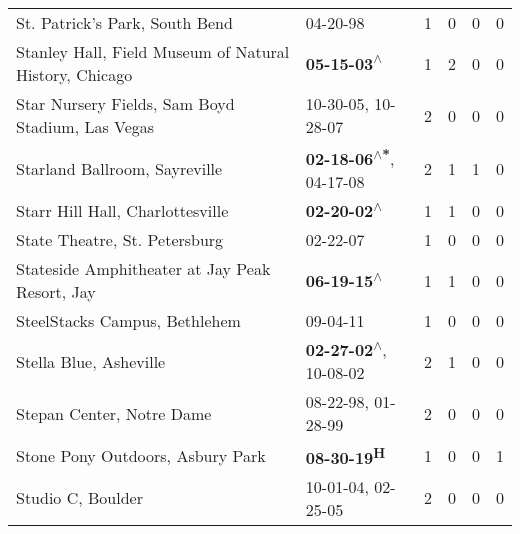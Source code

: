\begin{supertabular}{p{0.4\textwidth}p{0.3\textwidth}p{0.05\textwidth}p{0.05\textwidth}p{0.05\textwidth}p{0.05\textwidth}}
                                               St. Patrick's Park, South Bend &                                                                  04-20-98\textsuperscript{} &  1 &  0 &  0 &  0 \\
                       Stanley Hall, Field Museum of Natural History, Chicago &                                                 \textbf{05-15-03\textsuperscript{$\wedge$}} &  1 &  2 &  0 &  0 \\
                             Star Nursery Fields, Sam Boyd Stadium, Las Vegas &                                      10-30-05\textsuperscript{}, 10-28-07\textsuperscript{} &  2 &  0 &  0 &  0 \\
                                                Starland Ballroom, Sayreville &                    \textbf{02-18-06\textsuperscript{$\wedge$*}}, 04-17-08\textsuperscript{} &  2 &  1 &  1 &  0 \\
                                             Starr Hill Hall, Charlottesville &                                                 \textbf{02-20-02\textsuperscript{$\wedge$}} &  1 &  1 &  0 &  0 \\
                                                State Theatre, St. Petersburg &                                                                  02-22-07\textsuperscript{} &  1 &  0 &  0 &  0 \\
                               Stateside Amphitheater at Jay Peak Resort, Jay &                                                 \textbf{06-19-15\textsuperscript{$\wedge$}} &  1 &  1 &  0 &  0 \\
                                                SteelStacks Campus, Bethlehem &                                                                  09-04-11\textsuperscript{} &  1 &  0 &  0 &  0 \\
                                                       Stella Blue, Asheville &                     \textbf{02-27-02\textsuperscript{$\wedge$}}, 10-08-02\textsuperscript{} &  2 &  1 &  0 &  0 \\
                                                    Stepan Center, Notre Dame &                                      08-22-98\textsuperscript{}, 01-28-99\textsuperscript{} &  2 &  0 &  0 &  0 \\
                                             Stone Pony Outdoors, Asbury Park &                                                        \textbf{08-30-19\textsuperscript{H}} &  1 &  0 &  0 &  1 \\
                                                            Studio C, Boulder &                                      10-01-04\textsuperscript{}, 02-25-05\textsuperscript{} &  2 &  0 &  0 &  0 \\

\end{supertabular}
